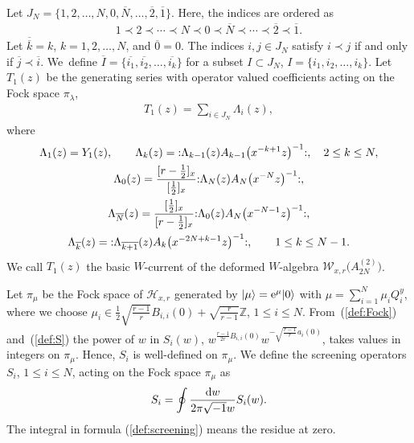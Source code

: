 \documentclass[pdftex]{sigma}
\numberwithin{equation}{section}
\begin{document}
Let $J_N=\{1,2,\dots,N,0,\overline{N},\dots,\overline{2},\overline{1}\}$.
Here, the indices are ordered as
\begin{gather*}
1 \prec 2 \prec \cdots \prec N \prec 0
\prec \overline{N} \prec \cdots \prec \overline{2} \prec \overline{1}.
\end{gather*}
Let $\overline{\overline{k}}=k$, $k=1,2,\dots, N$, and $\overline{0}=0$.
The indices $i, j \in J_N$ satisfy $i \prec j$ if and only if $\overline{j} \prec \overline{i}$.
We~define $\overline{I}=\{\overline{i_1}, \overline{i_2}, \dots, \overline{i_k}\}$ for a subset
$I \subset J_N$, $I=\{i_1, i_2, \dots, i_k\}$.
Let $T_1(z)$ be the generating series with operator valued coefficients acting on
the Fock space $\pi_\lambda$,
\begin{gather*}
T_1(z)=\sum_{i \in J_N}\Lambda_i(z),
\end{gather*}
where
\begin{gather}
\Lambda_1(z)=Y_1(z),\qquad
{\Lambda}_k(z)={:}\Lambda_{k-1}(z)A_{k-1}\big(x^{-k+1}z\big)^{-1}{:},\quad
2 \leq k \leq N,\notag
\\
\Lambda_0(z)=\frac{[r-\frac{1}{2}]_x}{[\frac{1}{2}]_x}{:}\Lambda_N(z)A_N\big(x^{-N}z\big)^{-1}{:},\notag
\\
\Lambda_{\overline{N}}(z)=\frac{[\frac{1}{2}]_x}{[r-\frac{1}{2}]_x}
{:}\Lambda_0(z)A_N\big(x^{-N-1}z\big)^{-1}{:},\notag
\\
\Lambda_{\overline{k}}(z)={:}\Lambda_{\overline{k+1}}(z)A_k\big(x^{-2N+k-1}z\big)^{-1}{:},\qquad
1\leq k \leq N-1.
\label{def:Lambda}
\end{gather}
We call $T_1(z)$ the basic $W$-current of the deformed $W$-algebra
${\mathcal W}_{x,r}\big(A_{2N}^{(2)}\big)$.

Let $\pi_\mu$ be the Fock space of ${\mathcal H}_{x,r}$ generated by $|\mu \rangle={\rm e}^\mu|0\rangle$ with
$\mu=\sum_{i=1}^N \mu_i Q_i^y$, where we choose
$\mu_i \in\frac{1}{2}\sqrt{\frac{r-1}{r}}B_{i,i}(0)+\sqrt{\frac{r}{r-1}}\mathbb{Z}$, $1\leq i \leq N$.
From~(\ref{def:Fock}) and~(\ref{def:S}) the power of $w$ in $S_i(w)$, $w^{\frac{r-1}{2r}B_{i,i}(0)}w^{-\sqrt{\frac{r-1}{r}}a_i(0)}$, takes values in integers on $\pi_\mu$.
Hence, $S_i$ is well-defined on $\pi_\mu$.
We define the screening operators $S_i$, $1\leq i \leq N$, acting on the Fock space $\pi_\mu$ as
\begin{gather}
S_i=\oint \frac{{\rm d}w}{{2\pi \sqrt{-1}w}} S_i(w).
\label{def:screening}
\end{gather}
The integral in formula (\ref{def:screening}) means the residue at zero.
\end{document}
